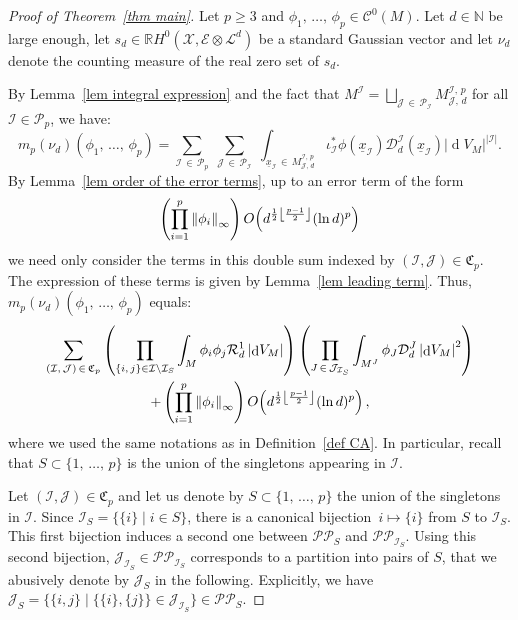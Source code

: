 \documentclass[10pt]{amsart}
\theoremstyle{definition}\newtheorem{defi}[theo]{Definition}\newtheorem{rema}[theo]{Remark}\newtheorem{exam}[theo]{Example}\newtheorem{exem}[theo]{Example}\newtheorem{nota}[theo]{Notation}
\DeclareMathOperator{\dmesure}{d}
\DeclarePairedDelimiter{\floor}{\lfloor}{\rfloor}
\newcommand{\D}{\mathcal{D}}
\newcommand{\E}{\mathcal{E}}
\newcommand{\I}{\mathcal{I}}
\newcommand{\J}{\mathcal{J}}
\newcommand{\X}{\mathcal{X}}
\renewcommand{\L}{\mathcal{L}}
\newcommand{\clC}{\mathcal{C}}
\newcommand{\clR}{\mathcal{R}}
\newcommand{\frkC}{\mathfrak{C}}
\newcommand{\pa}{\mathcal{P}\!}
\newcommand{\pp}{\mathcal{P\!P}\!}
\newcommand{\N}{\mathbb{N}}
\newcommand{\R}{\mathbb{R}}
\newcommand{\norm}[1]{\left\lvert #1 \right\rvert}
\newcommand{\Norm}[1]{\left\lVert #1 \right\rVert}
\newcommand{\rmes}[1]{\norm{\dmesure\! V_{#1}}}
\renewcommand{\H}{H^0(\X,\E \otimes \L^d)}
\renewcommand{\geq}{\geqslant}
\begin{document}
\begin{proof}[{Proof of Theorem~\ref{thm main}}]
Let $p \geq 3$ and $\phi_1,\,\dots,\,\phi_p \in \clC^0(M)$. Let $d \in \N$ be large enough, let $s_d \in \R\H$ be a standard Gaussian vector and let $\nu_d$ denote the counting measure of the real zero set of $s_d$.

By Lemma~\ref{lem integral expression} and the fact that $M^\I = \bigsqcup_{\J\,\in\,\pa_\I} M^{\I,\,p}_{\J,\,d}$ for all $\I \in \pa_p$, we have:
\[
m_p(\nu_d)(\phi_1,\,\dots,\,\phi_p) = \sum_{\I\,\in\,\pa_p} \;\sum_{\J\,\in\,\pa_\I}\;\int_{\underline{x}_\I\,\in\,M^{\I,\,p}_{\J,\,d}} \iota_\I^* \phi\left(\underline{x}_\I\right) \D_d^\I\left(\underline{x}_\I\right) \rmes{M}^{\norm{\I}}.
\]
By Lemma~\ref{lem order of the error terms}, up to an error term of the form
\[
\left(\prod_{i=1}^p \Norm{\phi_i}_\infty \right)O\!\left(d^{\frac{1}{2}\floor*{\frac{p-1}{2}}}(\ln d)^p\right)
\]
we need only consider the terms in this double sum indexed by $(\I,\J) \in \frkC_p$. The expression of these terms is given by Lemma~\ref{lem leading term}. Thus, $m_p(\nu_d)(\phi_1,\,\dots,\,\phi_p)$ equals:
\begin{multline}\label{eq mp}
\sum_{(\I,\,\J)\,\in\,\frkC_p} \left(\prod_{\{i,\,j\} \in \I \setminus \I_S} \int_M \phi_i\phi_j\clR^1_d \rmes{M}\right)\left(\prod_{J\,\in\,\J_{\I_S}} \int_{M^J} \phi_J \D_d^J \rmes{M}^2 \right)\\
+ \left(\prod_{i=1}^p \Norm{\phi_i}_\infty\right) O\!\left(d^{\frac{1}{2}\floor*{\frac{p-1}{2}}}(\ln d)^p\right),
\end{multline}
where we used the same notations as in Definition~\ref{def CA}. In particular, recall that $S \subset \{1,\,\dots,\,p\}$ is the union of the singletons appearing in $\I$.

Let $(\I,\J) \in \frkC_p$ and let us denote by $S \subset \{1,\,\dots,\,p\}$ the union of the singletons in $\I$. Since $\I_S = \{\{i\} \mid i \in S\}$, there is a canonical bijection~$i \mapsto \{i\}$ from $S$ to $\I_S$. This first bijection induces a second one between $\pp_S$ and $\pp_{\I_S}$. Using this second bijection, $\J_{\I_S} \in \pp_{\I_S}$ corresponds to a partition into pairs of $S$, that we abusively denote by $\J_S$ in the following. Explicitly, we have $\J_S = \{\{i,j\} \mid \{\{i\},\{j\}\} \in \J_{\I_S}\} \in \pp_S$.


\end{proof}
\end{document}
